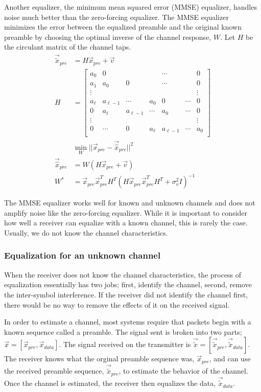 Another equalizer, the minimum mean squared error (MMSE) equalizer, handles noise much better than the zero-forcing equalizer.
The MMSE equalizer minimizes the error between the equalized preamble and the original known preamble by choosing the optimal inverse of the channel response, $W$.  Let $H$ be the circulant matrix of the channel taps.
\begin{align}
\vec{\tilde{x}}_{pre} &= H\vec{x}_{pre}+\vec{v}\\ 
H &= \begin{bmatrix}
a_0 & 0 & & & \cdots & & 0 \\
a_1 & a_0 & 0 & & \cdots & & 0 \\
\vdots & & & & & & \vdots \\
a_{\ell} & a_{\ell-1} & \cdots & a_0 & 0 & \cdots & 0 \\
0 & a_{\ell} & a_{\ell-1} & \cdots & a_0 & \cdots & 0 \\
\vdots & & & & & & \vdots \\
0 & \cdots & 0 & a_{\ell} & a_{\ell-1} & \cdots & a_0 \\
\end{bmatrix}\\
& \min_W||\vec{x}_{pre}-\vec{\hat{x}}_{pre}||^2 \\
\vec{\hat{x}}_{pre} &= W (H\vec{x}_{pre}+\vec{v}) \\
W^* &= \vec{x}_{pre} \vec{x}_{pre}^T H^T (H \vec{x}_{pre} \vec{x}_{pre}^T H^T + \sigma_v^2 I)^{-1}
\end{align}

The MMSE equalizer works well for known and unknown channels and does not amplify noise like the zero-forcing equalizer.
While it is important to consider how well a receiver can equalize with a known channel, this is rarely the case.  Usually, we do not know the channel characteristics.

\subsubsection{Equalization for an unknown channel}
When the receiver does not know the channel characteristics, the process of equalization essentially has two jobs; first, identify the channel, second, remove the inter-symbol interference. If the receiver did not identify the channel first, there would be no way to remove the effects of it on the received signal. 

In order to estimate a channel, most systems require that packets begin with a known sequence called a preamble. The signal sent is broken into two parts; $\vec{x} = [\vec{x}_{pre}, \vec{x}_{data}]$.  The signal received on the transmitter is $\vec{\tilde{x}}=[\vec{\tilde{x}}_{pre},\vec{\tilde{x}}_{data}]$.  
The receiver knows what the orginal preamble sequence was, $\vec{x}_{pre}$, and can use the received preamble sequence, $\vec{\tilde{x}}_{pre}$, to estimate the behavior of the channel.
Once the channel is estimated, the receiver then equalizes the data, $\vec{\tilde{x}}_{data}$.

